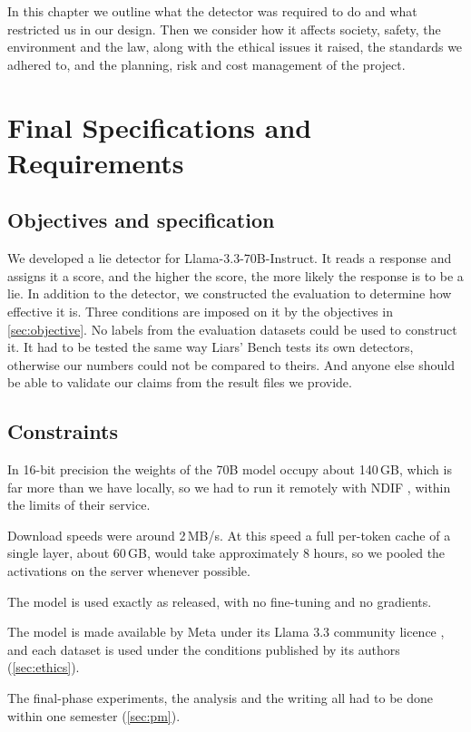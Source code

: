 \label{chap:req}

In this chapter we outline what the detector was required to do and what restricted us in our
design. Then we consider how it affects society, safety, the environment and the law, along with
the ethical issues it raised, the standards we adhered to, and the planning, risk and cost
management of the project.

\section{Final Specifications and Requirements}
\label{sec:specs}

\subsection{Objectives and specification}

We developed a lie detector for Llama-3.3-70B-Instruct. It reads a response and assigns it a
score, and the higher the score, the more likely the response is to be a lie. In addition to the
detector, we constructed the evaluation to determine how effective it is. Three conditions are
imposed on it by the objectives in \cref{sec:objective}. No labels from the evaluation datasets could be
used to construct it. It had to be tested the same way Liars' Bench tests its own detectors,
otherwise our numbers could not be compared to theirs. And anyone else should be able to
validate our claims from the result files we provide.

\subsection{Constraints}

\begin{description}[leftmargin=1.2em, labelindent=0em, itemsep=2pt]
\item[C1: Model access.] In 16-bit precision the weights of the 70B model occupy about 140\,GB,
  which is far more than we have locally, so we had to run it remotely with NDIF
  \cite{fiottokaufman2024nnsight}, within the limits of their service.
\item[C2: Bandwidth.] Download speeds were around 2\,MB/s. At this speed a full per-token cache of
  a single layer, about 60\,GB, would take approximately 8 hours, so we pooled the activations on
  the server whenever possible.
\item[C3: No training of the model.] The model is used exactly as released, with no fine-tuning and
  no gradients.
\item[C4: Licences.] The model is made available by Meta under its Llama 3.3 community licence
  \cite{meta2024llama33}, and each dataset is used under the conditions published by its authors
  (\cref{sec:ethics}).
\item[C5: Time.] The final-phase experiments, the analysis and the writing all had to be done within
  one semester (\cref{sec:pm}).
\end{description}

